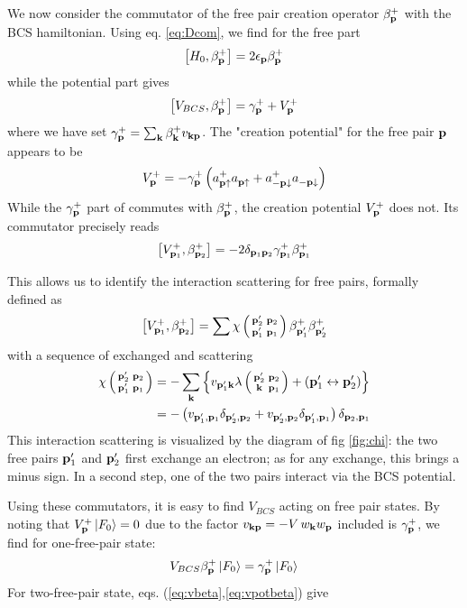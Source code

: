 \documentclass[aps,pra,amsmath,amssymb,preprint,groupedaddress]{revtex4}
\begin{document}
We now consider the commutator of the free pair creation operator $\beta^+_{\mathbf{p}}$ with the BCS hamiltonian.  Using eq. \eqref{eq:Dcom}, we find for the free part
\begin{equation}\label{eq:betaH}
\left[H_0,\beta^+_{\mathbf{p}}\right]=2\epsilon_{\mathbf{p}}\beta^+_{\mathbf{p}}
\end{equation}
while the potential part gives 
\begin{equation}\label{eq:vbeta}
\left[V_{BCS},\beta^+_{\mathbf{p}}\right]=\gamma^+_{\mathbf{p}}+V^+_{\mathbf{p}}
\end{equation}
where we have set $\gamma^+_{\mathbf{p}}=\sum_{\mathbf{k}}\beta^+_{\mathbf{k}}{}v_{\mathbf{k}\mathbf{p}}$. The "creation potential" for the free pair $\mathbf{p}$ appears to be 
\begin{equation}\label{eq:betaV}
V^+_{\mathbf{p}}=-{\gamma^+_{\mathbf{p}}}\left(a^+_{\mathbf{p}\uparrow}a^{}_{\mathbf{p}\uparrow}+a^+_{-\mathbf{p}\downarrow}a^{}_{-\mathbf{p}\downarrow}\right)
\end{equation}
While the $\gamma^+_{\mathbf{p}}$ part of  commutes with $\beta^+_{\mathbf{p}}$, the creation potential $V^+_{\mathbf{p}}$ does not.  Its commutator precisely reads
\begin{equation}\label{eq:vpotbeta}
\left[V^+_{\mathbf{p}_1},\beta^+_{\mathbf{p}_2}\right]=-2\delta_{\mathbf{p}_1\mathbf{p}_2}\gamma^+_{\mathbf{p}_1}\beta^+_{\mathbf{p}_1}
\end{equation}

This allows us to identify the interaction scattering for free pairs, formally defined as 
\begin{equation}
\left[V^+_{\mathbf{p}_1},\beta^+_{\mathbf{p}_2}\right]=\sum\chi\left(\begin{smallmatrix}\mathbf{p}'_2&\mathbf{p}_2\\\mathbf{p}'_1&\mathbf{p}_1\end{smallmatrix}\right)\beta^+_{\mathbf{p}'_1}\beta^+_{\mathbf{p}'_2}
\end{equation}
with a sequence of exchanged and scattering
\begin{equation}\label{eq:interactSc}
\begin{split}
\chi\left(\begin{smallmatrix}\mathbf{p}'_2&\mathbf{p}_2\\\mathbf{p}'_1&\mathbf{p}_1\end{smallmatrix}\right)&=-\sum_{\mathbf{k}}\left\{v_{\mathbf{p}'_1\mathbf{k}}\lambda\left(\begin{smallmatrix}\mathbf{p}'_2&\mathbf{p}_2\\\mathbf{k}&\mathbf{p}_1\end{smallmatrix}\right)+\left(\mathbf{p}'_1\leftrightarrow\mathbf{p}'_2\right)\right\}\\
&=-\left(v_{\mathbf{p}'_1,\mathbf{p}_1}\delta_{\mathbf{p}'_2,\mathbf{p}_2}+v_{\mathbf{p}'_2,\mathbf{p}_2}\delta_{\mathbf{p}'_1,\mathbf{p}_1}\right)\delta_{\mathbf{p}_2,\mathbf{p}_1}
\end{split}
\end{equation}
This interaction scattering is visualized by  the diagram of fig \ref{fig:chi}: the two free pairs $\mathbf{p}'_1$ and $\mathbf{p}'_2$ first exchange an electron; as for any exchange, this brings a minus sign.  In a second step, one of the two pairs interact via the BCS potential.  

Using these commutators, it is easy to find $V_{BCS}$ acting on free pair states.  By noting that $V^+_{\mathbf{p}}\left|F_0\right>=0$ due to the factor $v_{\mathbf{k}\mathbf{p}}=-V\,w_{\mathbf{k}}{}w_{\mathbf{p}}$  included is $\gamma^+_{\mathbf{p}}$, we find for one-free-pair state:
\begin{equation}
V_{BCS}\beta^+_{\mathbf{p}}\left|F_0\right>=\gamma^+_{\mathbf{p}}\left|F_0\right>
\end{equation}
For two-free-pair state,  eqs. (\ref{eq:vbeta},\ref{eq:vpotbeta}) give
\end{document}
